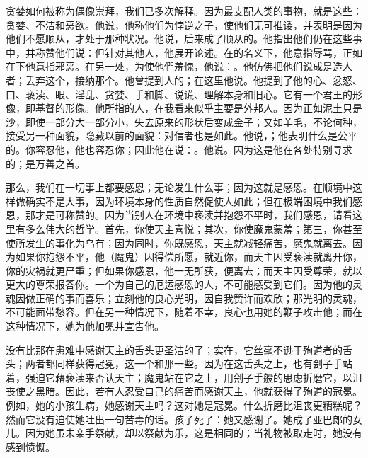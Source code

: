 贪婪如何被称为偶像崇拜，我们已多次解释。因为最支配人类的事物，就是这些：贪婪、不洁和恶欲。他说，他称他们为悖逆之子，使他们无可推诿，并表明是因为他们不愿顺从，才处于那种状况。他说，后来成了顺从的。他指出他们仍在这些事中，并称赞他们说：但针对其他人，他展开论述。在的名义下，他意指辱骂，正如在下他意指邪恶。在另一处，为使他們羞愧，他说：。他仿佛把他们说成是造人者；丢弃这个，接纳那个。他曾提到人的；在这里他说。他提到了他的心、忿怒、口、亵渎、眼、淫乱、贪婪、手和脚、说谎、理解本身和旧心。它有一个君王的形像，即基督的形像。他所指的人，在我看来似乎主要是外邦人。因为正如泥土只是沙，即使一部分大一部分小，失去原来的形状后变成金子；又如羊毛，不论何种，接受另一种面貌，隐藏以前的面貌：对信者也是如此。他说，；他表明什么是公平的。你容忍他，他也容忍你；因此他在说：。他说。因为这是他在各处特别寻求的；是万善之首。\par

那么，我们在一切事上都要感恩；无论发生什么事；因为这就是感恩。在顺境中这样做确实不是大事，因为环境本身的性质自然促使人如此；但在极端困境中我们感恩，那才是可称赞的。因为当别人在环境中亵渎并抱怨不平时，我们感恩，请看这里有多么伟大的哲学。首先，你使天主喜悦；其次，你使魔鬼蒙羞；第三，你甚至使所发生的事化为乌有；因为同时，你既感恩，天主就减轻痛苦，魔鬼就离去。因为如果你抱怨不平，他（魔鬼）因得偿所愿，就近你，而天主因受亵渎就离开你，你的灾祸就更严重；但如果你感恩，他一无所获，便离去；而天主因受尊荣，就以更大的尊荣报答你。一个为自己的厄运感恩的人，不可能感受到它们。因为他的灵魂因做正确的事而喜乐；立刻他的良心光明，因自我赞许而欢欣；那光明的灵魂，不可能面带愁容。但在另一种情况下，随着不幸，良心也用她的鞭子攻击他；而在这种情况下，她为他加冕并宣告他。\par

没有比那在患难中感谢天主的舌头更圣洁的了；实在，它丝毫不逊于殉道者的舌头；两者都同样获得冠冕，这一个和那一些。因为在这舌头之上，也有刽子手站着，强迫它藉亵渎来否认天主；魔鬼站在它之上，用刽子手般的思虑折磨它，以沮丧使之黑暗。因此，若有人忍受自己的痛苦而感谢天主，他就获得了殉道的冠冕。例如，她的小孩生病，她感谢天主吗？这对她是冠冕。什么折磨比沮丧更糟糕呢？然而它没有迫使她吐出一句苦毒的话。孩子死了：她又感谢了。她成了亚巴郎的女儿。因为她虽未亲手祭献，却以祭献为乐，这是相同的；当礼物被取走时，她没有感到愤慨。\par

